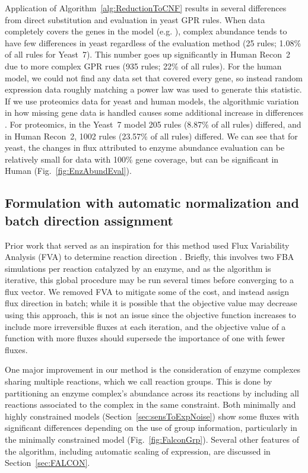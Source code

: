 Application of \suppOrApp Algorithm~\ref{alg:ReductionToCNF} results in several
differences from direct substitution and evaluation in yeast GPR
rules. When data completely covers the genes in the model
(e.g. \citealt{Lee2012}), complex abundance tends to have few differences in yeast
regardless of the evaluation method (25 rules; 1.08\% of all rules for
Yeast~7). This number goes up significantly in Human Recon~2
\citep{Thiele2013} due to more complex GPR rues (935 rules; 22\% of
all rules). For the human model, we could not find any data set that
covered every gene, so instead random expression data roughly matching
a power law was used to generate this statistic. If we use proteomics
data for yeast and human models, the algorithmic variation in how missing gene
data is handled causes some additional increase in differences
\citep{Picotti2013,Gholami2013}.  For proteomics, in the Yeast~7 model
205 rules (8.87\% of all rules) differed, and in Human Recon~2, 1002
rules (23.57\% of all rules) differed. We can see that for yeast, the
changes in flux attributed to enzyme abundance evaluation can be
relatively small for data with 100\% gene coverage, but can be 
significant in Human (\suppOrApp Fig.~\ref{fig:EnzAbundEval}).

%
%


\subsection{Formulation with automatic normalization and batch direction assignment}

Prior work that served as an inspiration for this method used Flux
Variability Analysis (FVA) to determine reaction direction
\citep{Lee2012}. Briefly, this involves two FBA simulations per
reaction catalyzed by an enzyme, and as the algorithm is iterative,
this global procedure may be run several times before converging to a
flux vector. We removed FVA to mitigate some
of the cost, and instead assign flux direction in batch; while it is
possible that the objective value may decrease using this approach,
this is not an issue since the objective function increases to include
more irreversible fluxes at each iteration, and the objective value of
a function with more fluxes should supersede the importance of one
with fewer fluxes.

One major improvement in our method is the consideration of enzyme
complexes sharing multiple reactions, which we call reaction groups.
This is done by partitioning an enzyme complex's abundance across
its reactions by including all reactions associated to the complex
in the same constraint.
Both minimally and highly constrained models
(Section~\ref{sec:sensToExpNoise}) show some fluxes with significant
differences depending on the use of group information, particularly in
the minimally constrained model (Fig.~\ref{fig:FalconGrp}). Several
other features of the algorithm, including automatic scaling of
expression, are discussed in \suppOrApp Section~\ref{sec:FALCON}.

